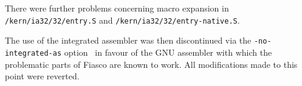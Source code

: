 There were further problems concerning macro expansion in
\texttt{/kern/ia32/32\-/en\-try.S} and \texttt{/kern/ia32/32\-/entry-native.S}.

The use of the integrated assembler was then discontinued via the
\texttt{-no-integrated-as} option~\cite{manclang} in favour of the GNU
assembler with which the problematic parts of Fiasco are known to work.
All modifications made to this point were reverted.
